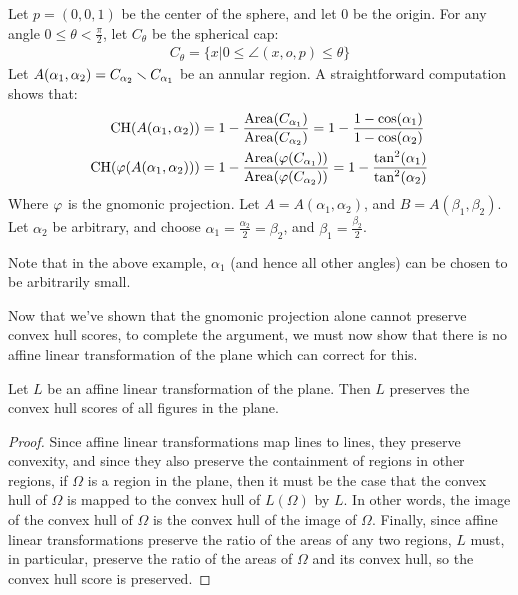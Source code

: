 \begin{example}
  Let $p = (0,0,1)$ be the center of the sphere, and let $0$ be the
  origin. For any angle $0\le \theta< \frac\pi2$, let $C_\theta$ be
  the spherical cap:
  \begin{align*}
    C_{\theta} = \{x|0\le\angle(x,o,p)\le \theta\}
  \end{align*}
  Let $A(\alpha_1,\alpha_2) = C_{\alpha_2}\smallsetminus C_{\alpha_1}$ be 
  an annular region. A straightforward computation shows that:
  \begin{align*}
    \mathrm{CH}(A(\alpha_1,\alpha_2)) &= 
    1-\frac{\mathrm{Area}(C_{\alpha_1})}{\mathrm{Area}(C_{\alpha_2})}
    =1- \frac{1-\cos(\alpha_1)}{1-\cos(\alpha_2)}\\
    \mathrm{CH}(\vphi(A(\alpha_1,\alpha_2))) &=
    1-\frac{\mathrm{Area}(\vphi(C_{\alpha_1}))}%
    {\mathrm{Area}(\vphi(C_{\alpha_2}))}
      =1- \frac{\tan^2(\alpha_1)}{\tan^2(\alpha_2)}
  \end{align*}
  Where $\varphi$ is the gnomonic projection. 
  Let $A=A(\alpha_1,\alpha_2)$, and $B = A(\beta_1,\beta_2)$. 
  Let $\alpha_2$ be arbitrary, and choose 
  $\alpha_1 = \frac{\alpha_2}{2} = \beta_2$, and 
  $\beta_1 = \frac{\beta_2}{2}$. 
\end{example}
Note that in the above example, $\alpha_1$ (and hence 
all other angles) can be chosen to be arbitrarily small. 

Now that we've shown that the gnomonic projection alone cannot
preserve convex hull scores, to complete the argument, we must now
show that there is no affine linear transformation of the plane which
can correct for this.

\begin{lemma}\label{lem:noafflin}
  Let $L$ be an affine linear transformation of the plane.  Then $L$
  preserves the convex hull scores of all figures in the plane.
\end{lemma}
\begin{proof}
  Since affine linear transformations map lines to lines, they preserve
  convexity, and since they also preserve the containment of regions in
  other regions, if $\Omega$ is a region in the plane, then it must be
  the case that the convex hull of $\Omega$ is mapped to the convex hull
  of $L(\Omega)$ by $L$.  In other words, the image of the convex hull
  of $\Omega$ is the convex hull of the image of $\Omega$.  Finally,
  since affine linear transformations preserve the ratio of the areas of
  any two regions, $L$ must, in particular, preserve the ratio of the
  areas of $\Omega$ and its convex hull, so the convex hull score is
  preserved.
\end{proof}

